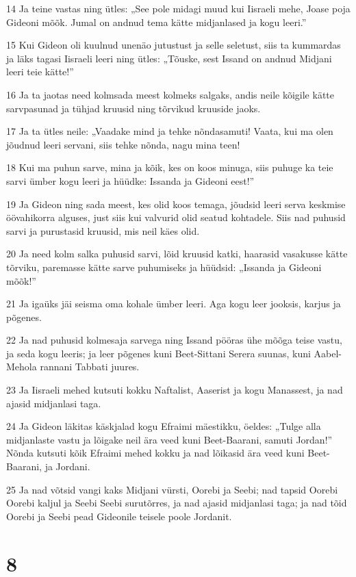 \par 14 Ja teine vastas ning ütles: „See pole midagi muud kui Iisraeli mehe, Joase poja Gideoni mõõk. Jumal on andnud tema kätte midjanlased ja kogu leeri.”
\par 15 Kui Gideon oli kuulnud unenäo jutustust ja selle seletust, siis ta kummardas ja läks tagasi Iisraeli leeri ning ütles: „Tõuske, sest Issand on andnud Midjani leeri teie kätte!”
\par 16 Ja ta jaotas need kolmsada meest kolmeks salgaks, andis neile kõigile kätte sarvpasunad ja tühjad kruusid ning tõrvikud kruuside jaoks.
\par 17 Ja ta ütles neile: „Vaadake mind ja tehke nõndasamuti! Vaata, kui ma olen jõudnud leeri servani, siis tehke nõnda, nagu mina teen!
\par 18 Kui ma puhun sarve, mina ja kõik, kes on koos minuga, siis puhuge ka teie sarvi ümber kogu leeri ja hüüdke: Issanda ja Gideoni eest!”
\par 19 Ja Gideon ning sada meest, kes olid koos temaga, jõudsid leeri serva keskmise öövahikorra alguses, just siis kui valvurid olid seatud kohtadele. Siis nad puhusid sarvi ja purustasid kruusid, mis neil käes olid.
\par 20 Ja need kolm salka puhusid sarvi, lõid kruusid katki, haarasid vasakusse kätte tõrviku, paremasse kätte sarve puhumiseks ja hüüdsid: „Issanda ja Gideoni mõõk!”
\par 21 Ja igaüks jäi seisma oma kohale ümber leeri. Aga kogu leer jooksis, karjus ja põgenes.
\par 22 Ja nad puhusid kolmesaja sarvega ning Issand pööras ühe mõõga teise vastu, ja seda kogu leeris; ja leer põgenes kuni Beet-Sittani Serera suunas, kuni Aabel-Mehola rannani Tabbati juures.
\par 23 Ja Iisraeli mehed kutsuti kokku Naftalist, Aaserist ja kogu Manassest, ja nad ajasid midjanlasi taga.
\par 24 Ja Gideon läkitas käskjalad kogu Efraimi mäestikku, öeldes: „Tulge alla midjanlaste vastu ja lõigake neil ära veed kuni Beet-Baarani, samuti Jordan!” Nõnda kutsuti kõik Efraimi mehed kokku ja nad lõikasid ära veed kuni Beet-Baarani, ja Jordani.
\par 25 Ja nad võtsid vangi kaks Midjani vürsti, Oorebi ja Seebi; nad tapsid Oorebi Oorebi kaljul ja Seebi Seebi surutõrres, ja nad ajasid midjanlasi taga; ja nad tõid Oorebi ja Seebi pead Gideonile teisele poole Jordanit.

\chapter{8}

